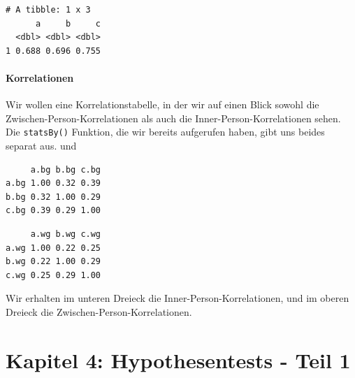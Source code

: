\documentclass[
  letterpaper,
  DIV=11,
  numbers=noendperiod]{scrreprt}
\newenvironment{Shaded}{\begin{snugshade}}{\end{snugshade}}
\newcommand{\CommentTok}[1]{\textcolor[rgb]{0.37,0.37,0.37}{#1}}
\newcommand{\DecValTok}[1]{\textcolor[rgb]{0.68,0.00,0.00}{#1}}
\newcommand{\FunctionTok}[1]{\textcolor[rgb]{0.28,0.35,0.67}{#1}}
\newcommand{\NormalTok}[1]{\textcolor[rgb]{0.00,0.23,0.31}{#1}}
\newcommand{\SpecialCharTok}[1]{\textcolor[rgb]{0.37,0.37,0.37}{#1}}
\begin{document}
\begin{verbatim}
# A tibble: 1 x 3
      a     b     c
  <dbl> <dbl> <dbl>
1 0.688 0.696 0.755
\end{verbatim}

\subsubsection{Korrelationen}\label{korrelationen}

Wir wollen eine Korrelationstabelle, in der wir auf einen Blick sowohl
die Zwischen-Person-Korrelationen als auch die
Inner-Person-Korrelationen sehen. Die \texttt{statsBy()} Funktion, die
wir bereits aufgerufen haben, gibt uns beides separat aus. und

\begin{Shaded}
\end{Shaded}

\begin{verbatim}
     a.bg b.bg c.bg
a.bg 1.00 0.32 0.39
b.bg 0.32 1.00 0.29
c.bg 0.39 0.29 1.00
\end{verbatim}

\begin{Shaded}
\end{Shaded}

\begin{verbatim}
     a.wg b.wg c.wg
a.wg 1.00 0.22 0.25
b.wg 0.22 1.00 0.29
c.wg 0.25 0.29 1.00
\end{verbatim}

Wir erhalten im unteren Dreieck die Inner-Person-Korrelationen, und im
oberen Dreieck die Zwischen-Person-Korrelationen.


\chapter{Kapitel 4: Hypothesentests - Teil
1}\label{kapitel-4-hypothesentests---teil-1}
\end{document}
